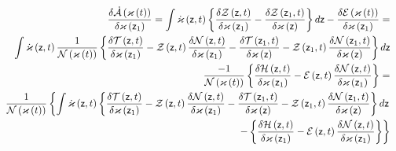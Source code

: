\begin{eqnarray}
&&\frac{\delta {\cal \dot{A}}\left( \varkappa \left( t\right) \right) }{%
\delta \varkappa \left( {\sf z}_{1}\right) }=\int {\cal \dot{\varkappa}}%
\left( {\sf z},t\right) \left\{ \frac{\delta {\cal Z}\left( {\sf z},t\right) 
}{\delta \varkappa \left( {\sf z}_{1}\right) }-\frac{\delta {\cal Z}\left( 
{\sf z}_{1},t\right) }{\delta {\cal \varkappa }\left( {\sf z}\right) }%
\right\} d{\sf z}-\frac{\delta {\cal E}\left( {\cal \varkappa }\left(
t\right) \right) }{\delta \varkappa \left( {\sf z}_{1}\right) }= \\
&&\int {\cal \dot{\varkappa}}\left( {\sf z},t\right) \frac{1}{{\cal N}\left( 
{\cal \varkappa }\left( t\right) \right) }\left\{ \frac{\delta {\cal T}%
\left( {\sf z},t\right) }{\delta \varkappa \left( {\sf z}_{1}\right) }-{\cal %
Z}\left( {\sf z},t\right) \frac{\delta {\cal N}\left( {\sf z},t\right) }{%
\delta \varkappa \left( {\sf z}_{1}\right) }-\frac{\delta {\cal T}\left( 
{\sf z}_{1},t\right) }{\delta \varkappa \left( {\sf z}\right) }-{\cal Z}%
\left( {\sf z}_{1},t\right) \frac{\delta {\cal N}\left( {\sf z}_{1},t\right) 
}{\delta \varkappa \left( {\sf z}\right) }\right\} d{\sf z} \\
&&\frac{-1}{{\cal N}\left( {\cal \varkappa }\left( t\right) \right) }\left\{ 
\frac{\delta {\cal H}\left( {\sf z},t\right) }{\delta \varkappa \left( {\sf z%
}_{1}\right) }-{\cal E}\left( {\sf z},t\right) \frac{\delta {\cal N}\left( 
{\sf z},t\right) }{\delta \varkappa \left( {\sf z}_{1}\right) }\right\} = \\
&&\frac{1}{{\cal N}\left( {\cal \varkappa }\left( t\right) \right) }\left\{
\int {\cal \dot{\varkappa}}\left( {\sf z},t\right) \left\{ \frac{\delta 
{\cal T}\left( {\sf z},t\right) }{\delta \varkappa \left( {\sf z}_{1}\right) 
}-{\cal Z}\left( {\sf z},t\right) \frac{\delta {\cal N}\left( {\sf z}%
,t\right) }{\delta \varkappa \left( {\sf z}_{1}\right) }-\frac{\delta {\cal T%
}\left( {\sf z}_{1},t\right) }{\delta \varkappa \left( {\sf z}\right) }-%
{\cal Z}\left( {\sf z}_{1},t\right) \frac{\delta {\cal N}\left( {\sf z}%
_{1},t\right) }{\delta \varkappa \left( {\sf z}\right) }\right\} d{\sf z}%
\right. \\
&&\left. -\left\{ \frac{\delta {\cal H}\left( {\sf z},t\right) }{\delta
\varkappa \left( {\sf z}_{1}\right) }-{\cal E}\left( {\sf z},t\right) \frac{%
\delta {\cal N}\left( {\sf z},t\right) }{\delta \varkappa \left( {\sf z}%
_{1}\right) }\right\} \right\}
\end{eqnarray}%
